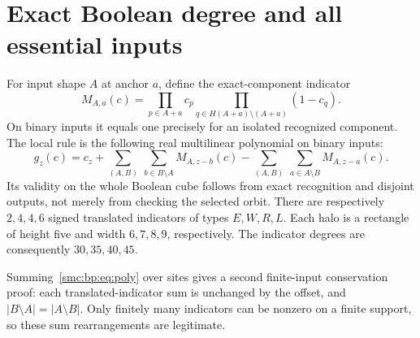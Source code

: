 \documentclass[11pt,letterpaper]{article}
\numberwithin{equation}{section}
\theoremstyle{definition}
\theoremstyle{remark}
\begin{document}
\section{Exact Boolean degree and all essential inputs}\label{smc:bp:sec:degree}
For input shape $A$ at anchor $a$, define the exact-component indicator
\begin{equation}\label{smc:bp:eq:indicator}
M_{A,a}(c)=\prod_{p\in A+a}c_p\prod_{q\in H(A+a)\setminus(A+a)}(1-c_q).
\end{equation}
On binary inputs it equals one precisely for an isolated recognized component. The local rule is the following real multilinear polynomial on binary inputs:
\begin{equation}\label{smc:bp:eq:poly}
g_z(c)=c_z+
\sum_{(A,B)}\ \sum_{b\in B\setminus A}M_{A,z-b}(c)
-\sum_{(A,B)}\ \sum_{a\in A\setminus B}M_{A,z-a}(c).
\end{equation}
Its validity on the whole Boolean cube follows from exact recognition and disjoint outputs, not merely from checking the selected orbit. There are respectively $2,4,4,6$ signed translated indicators of types $E,W,R,L$. Each halo is a rectangle of height five and width $6,7,8,9$, respectively. The indicator degrees are consequently $30,35,40,45$.

Summing~\eqref{smc:bp:eq:poly} over sites gives a second finite-input conservation proof: each translated-indicator sum is unchanged by the offset, and $|B\setminus A|=|A\setminus B|$. Only finitely many indicators can be nonzero on a finite support, so these sum rearrangements are legitimate.
\end{document}

